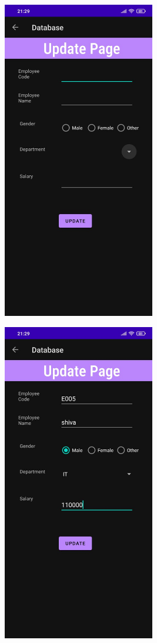 \documentclass[12pt,letterpaper]{article}
\begin{document}
\subsubsection*{}
\begin{figure}[h]
    \centering
    \includegraphics[height=14cm, keepaspectratio]{Outputs/OP6.jpeg}
\end{figure}
\begin{figure}
    \centering
    \includegraphics[height=14cm, keepaspectratio]{Outputs/OP7.jpeg}
\end{figure}
\end{document}
